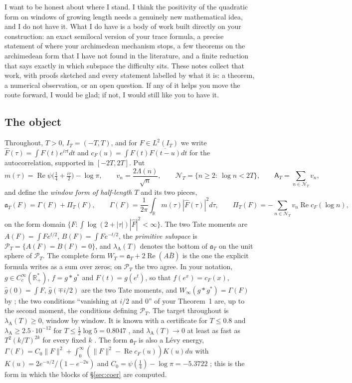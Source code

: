 \documentclass[11pt]{amsart}
\theoremstyle{definition}
\theoremstyle{remark}
\newcommand{\R}{\mathbb R}
\newcommand{\Rel}{\operatorname{Re}}
\newcommand{\IT}{I_T}
\newcommand{\PT}{\mathcal P_T}
\newcommand{\Fh}{\widehat F}
\newcommand{\cF}{c_F}
\newcommand{\NT}{\mathcal N_T}
\newcommand{\Aconst}{\mathsf A_T}
\newcommand{\PiT}{\Pi_T}
\newcommand{\lamA}{\lambda_{\mathrm A}}
\begin{document}
I want to be honest about where I stand. I think the positivity of the quadratic form on windows of
growing length needs a genuinely new mathematical idea, and I do not have it. What I do have is a body of
work built directly on your construction: an exact semilocal version of your trace formula, a precise
statement of where your archimedean mechanism stops, a few theorems on the archimedean form that I have
not found in the literature, and a finite reduction that says exactly in which subspace the difficulty
sits. These notes collect that work, with proofs sketched and every statement labelled by what it is: a
theorem, a numerical observation, or an open question. If any of it helps you move the route forward, I
would be glad; if not, I would still like you to have it.

\subsection*{The object}
Throughout, $T>0$, $\IT=(-T,T)$, and for $F\in L^2(\IT)$ we write $\Fh(\tau)=\int F(t)e^{i\tau t}dt$ and
$\cF(u)=\int F(t)\overline{F(t-u)}dt$ for the autocorrelation, supported in $[-2T,2T]$. Put
\[
m(\tau)=\Rel\psi\big(\tfrac14+\tfrac{i\tau}2\big)-\log\pi,\qquad v_n=\frac{2\Lambda(n)}{\sqrt n},\qquad
\NT=\{n\ge2:\ \log n<2T\},\qquad \Aconst=\sum_{n\in\NT}v_n,
\]
and define the \emph{window form of half-length $T$} and its two pieces,
\begin{equation}\label{eq:form}
\mathfrak a_T(F)=\Gamma(F)+\PiT(F),\qquad
\Gamma(F)=\frac1{2\pi}\int_\R m(\tau)|\Fh(\tau)|^2d\tau,\qquad
\PiT(F)=-\sum_{n\in\NT}v_n\Rel\cF(\log n),
\end{equation}
on the form domain $\{F:\int\log(2+|\tau|)|\Fh|^2<\infty\}$. The two Tate moments are
$A(F)=\int Fe^{t/2}$, $B(F)=\int Fe^{-t/2}$, the \emph{primitive subspace} is $\PT=\{A(F)=B(F)=0\}$, and
$\lamA(T)$ denotes the bottom of $\mathfrak a_T$ on the unit sphere of $\PT$. The complete form
$W_T=\mathfrak a_T+2\Rel(A\bar B)$ is the one the explicit formula writes as a sum over zeros; on $\PT$ the
two agree. In your notation, $g\in C_c^\infty(\R_+^*)$, $f=g*g^*$ and $F(t)=g(e^t)$, so that $f(e^x)=\cF(x)$,
$\widehat g(0)=\int F$, $\widehat g(\mp i/2)$ are the two Tate moments, and $W_\infty(g*g^*)=\Gamma(F)$ by
\cite[(152)--(154)]{CC2021}; the two conditions ``vanishing at $i/2$ and $0$'' of your Theorem~1 are, up to
the second moment, the conditions defining $\PT$. The target throughout is $\lamA(T)\ge0$, window by window.
It is known with a certificate for $T\le0.8$ \cite{Zhu2026} and $\lamA\ge2.5\cdot10^{-12}$ for
$T\le\frac12\log5=0.8047$ \cite[Thm.~log5A]{Paper47}, and $\lamA(T)\to0$ at least as fast as
$T^2(k/T)^{2k}$ for every fixed $k$ \cite[Thm.~margin]{Paper47}. The form $\mathfrak a_T$ is also a L\'evy
energy, $\Gamma(F)=C_0\|F\|^2+\int_0^\infty(\|F\|^2-\Rel\cF(u))K(u)du$ with
$K(u)=2e^{-u/2}/(1-e^{-2u})$ and $C_0=\psi(\frac14)-\log\pi=-5.3722$ \cite[Lemma~K]{Paper47}; this
is the form in which the blocks of \S\ref{sec:coer} are computed.
\end{document}
